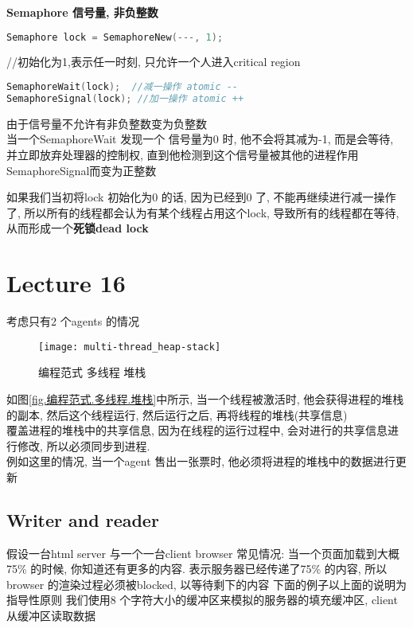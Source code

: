 \documentclass{article}
\begin{document}
\textbf{Semaphore 信号量, 非负整数}
\begin{lstlisting}[language = C]
Semaphore lock = SemaphoreNew(---, 1);
\end{lstlisting}
//初始化为1,表示任一时刻, 只允许一个人进入critical region

\begin{lstlisting}[language = C]
SemaphoreWait(lock);  //减一操作 atomic --
SemaphoreSignal(lock); //加一操作 atomic ++
\end{lstlisting}
由于信号量不允许有非负整数变为负整数\\
当一个SemaphoreWait 发现一个 信号量为0 时, 他不会将其减为-1, 而是会等待, 并立即放弃处理器的控制权, 直到他检测到这个信号量被其他的进程作用SemaphoreSignal而变为正整数

如果我们当初将lock 初始化为0 的话, 因为已经到0 了, 不能再继续进行减一操作了, 所以所有的线程都会认为有某个线程占用这个lock, 导致所有的线程都在等待, 从而形成一个\textbf{死锁dead lock}

\section{Lecture 16}
考虑只有2 个agents 的情况
\begin{figure}[htbp]
	\centering
	\texttt{[image: multi-thread\_heap-stack]}\\
	\caption{编程范式 多线程 堆栈}\label{fig.multi-thread.heap-stack}
\end{figure}

如图\ref{fig.编程范式.多线程.堆栈}中所示, 当一个线程被激活时, 他会获得进程的堆栈的副本, 然后这个线程运行, 然后运行之后, 再将线程的堆栈(共享信息)\\覆盖进程的堆栈中的共享信息, 因为在线程的运行过程中, 会对进行的共享信息进行修改, 所以必须同步到进程.\\
例如这里的情况, 当一个agent 售出一张票时, 他必须将进程的堆栈中的数据进行更新\\

\subsection{Writer and reader}
假设一台html server 与一个一台client browser
常见情况: 当一个页面加载到大概75\% 的时候, 你知道还有更多的内容. 表示服务器已经传递了75\% 的内容, 所以browser 的渲染过程必须被blocked, 以等待剩下的内容
下面的例子以上面的说明为指导性原则
我们使用8 个字符大小的缓冲区来模拟的服务器的填充缓冲区, client 从缓冲区读取数据
\end{document}
